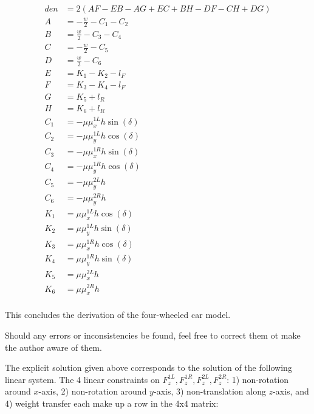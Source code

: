 \documentclass[paper=a4, fontsize=11pt]{scrartcl} %
\numberwithin{equation}{section} %
\numberwithin{figure}{section} %
\numberwithin{table}{section} %
\begin{document}
\begin{align}
den &= 2(AF - EB - AG + EC + BH - DF - CH + DG) \\
A &= -\frac{w}{2} - C_1 - C_2 \\
B &= \frac{w}{2} - C_3 - C_4 \\
C &= -\frac{w}{2} - C_5 \\
D &= \frac{w}{2} - C_6 \\
E &= K_1 - K_2 - l_F \\
F &= K_3 - K_4 - l_F \\
G &= K_5 + l_R \\
H &= K_6 + l_R \\
C_1 &= -\mu \mu^{1L}_x h \sin(\delta) \\
C_2 &= -\mu \mu^{1L}_y h \cos(\delta) \\
C_3 &= -\mu \mu^{1R}_x h \sin(\delta) \\
C_4 &= -\mu \mu^{1R}_y h \cos(\delta) \\
C_5 &= -\mu \mu^{2L}_y h  \\
C_6 &= -\mu \mu^{2R}_y h  \\
K_1 &= \mu \mu^{1L}_x h \cos(\delta) \\
K_2 &= \mu \mu^{1L}_y h \sin(\delta) \\
K_3 &= \mu \mu^{1R}_x h \cos(\delta) \\
K_4 &= \mu \mu^{1R}_y h \sin(\delta) \\
K_5 &= \mu \mu^{2L}_x h \\
K_6 &= \mu \mu^{2R}_x h \\
\end{align}

This concludes the derivation of the four-wheeled car model.


Should any errors or inconsistencies be found, feel free to correct them ot make the author aware of them.

\bigskip

The explicit solution given above corresponds to the solution of the following linear system. The 4 linear constraints on $F_z^{1L},F_z^{1R},F_z^{2L},F_z^{2R}$: 1) non-rotation around $x$-axis, 2) non-rotation around $y$-axis, 3) non-translation along $z$-axis, and 4) weight transfer each make up a row in the 4x4 matrix:
\end{document}
